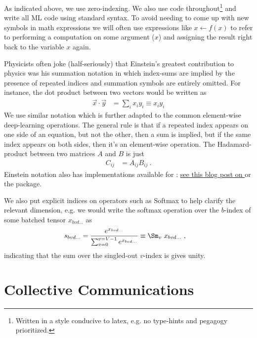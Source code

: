 \documentclass[11pt]{article}
\begin{document}
As indicated above,  we use zero-indexing. We also use  code
throughout\footnote{Written in a style conducive to latex, e.g. no type-hints and pegagogy
prioritized.}  and
write all ML code using standard  syntax. To avoid needing to come up with new
symbols in math expressions we will often use expressions like $ x \leftarrow f(x) $ to refer to performing
a computation on some argument ($ x $) and assigning the result right back to the variable $ x $
again.

Physicists often joke (half-seriously) that Einstein's greatest contribution to physics was his
summation notation in which index-sums are implied by the presence of repeated indices and summation
symbols are entirely omitted. For instance, the dot product between two vectors would be written as
\begin{align}
    \vec{x} \cdot \vec{y} &= \sum _{ i } x _{ i } y _{ i } \equiv x _{ i } y _{  i }
    \label{app_eq_einstein_sum}
\end{align}
We use similar notation which is further adapted to the common element-wise deep-learning
operations.  The general rule is that if a repeated index appears on one side of an equation, but
not the other, then a sum is implied, but if the same index appears on both sides, then it's an
element-wise operation. The Hadamard-product between two matrices $ A $ and $ B $ is just
\begin{align}
  C _{ ij } &= A _{ ij } B _{ ij }\ .
\end{align}
Einstein notation also has implementations available for :
\href{https://rockt.github.io/2018/04/30/einsum}{see this blog post on } or the
\href{https://einops.rocks/1-einops-basics/}{} package.

 We also put explicit indices on operators such as Softmax to help clarify the relevant
 dimension, e.g. we would write the softmax operation over the $ b $-index of some batched
 tensor $ x _{ bvd\ldots } $ as
 \begin{align}
     s _{ bvd\ldots } &= \frac{ e^{ x _{ bv d\ldots}  } }{ \sum _{ v = 0 } ^{  v= V-1 } e^{ x _{
     bvd\ldots } } } \equiv
     \Sm _{ v } \ x _{ bvd\ldots }
     \ , \label{app_eq_einstein_softmax}
 \end{align}
 indicating that the sum over the singled-out $ v $-index is gives unity.

\section{Collective Communications \label{app_collective_communications} }
\end{document}

